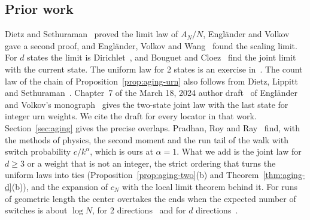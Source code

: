 \subsection{Prior work}\label{sec:prior}

Dietz and Sethuraman~\cite{ds2007} proved the limit law of $A_N/N$,
Engl\"ander and Volkov~\cite{ev2018} gave a second proof, and Engl\"ander,
Volkov and Wang~\cite{evw2020} found the scaling limit. For $d$ states the
limit is Dirichlet~\cite[Theorem~1.4]{ds2007}, and Bouguet and
Cloez~\cite[Propositions~4.1 and~4.5]{bc2018} find the joint limit with the
current state. The uniform law for 2 states is an exercise
in~\cite[Section~3.1, footnote~1]{evw2020}. The count law of the chain of
Proposition~\ref{prop:aging-urn} also follows from Dietz, Lippitt and
Sethuraman~\cite[Theorem~2.18]{dls2023}. Chapter~7 of the March 18, 2024
author draft~\cite{ev2024} of Engl\"ander and Volkov's
monograph~\cite{ev2025} gives the two-state joint law with the last state for
integer urn weights. We cite the draft for every locator in that work.
Section~\ref{sec:aging} gives the precise overlaps. Pradhan, Roy and
Ray~\cite{prr2026} find, with the methods of physics, the second moment and
the run tail of the walk with switch probability $c/k^\alpha$, which is ours
at $\alpha=1$. What we add is the joint law for $d\ge3$ or a
weight that is not an integer, the strict ordering that turns the uniform laws
into ties (Proposition~\ref{prop:aging-two}(b) and
Theorem~\ref{thm:aging-d}(b)), and the expansion of $c_N$ with the local limit
theorem behind it. For runs of geometric length the center overtakes the
ends when the expected number of switches is about $\log N$, for 2
directions~\cite{paperA} and for $d$ directions~\cite{paperB}.
